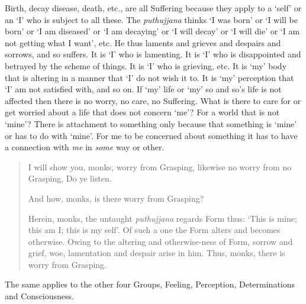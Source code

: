 Birth, decay disease, death, etc., are all Suffering because they apply to a `self' or an `I' who is subject to all these. The \textit{puthujjana} thinks `I was born' or `I will be born' or `I am diseased' or `I am decaying' or `I will decay' or `I will die' or `I am not getting what I want', etc. He thus laments and grieves and despairs and sorrows, and so suffers. It is `I' who is lamenting. It is `I' who is disappointed and betrayed by the scheme of things. It is `I' who is grieving, etc. It is `my' body that is altering in a manner that `I' do not wish it to. It is `my' perception that `I' am not satisfied with, and so on. If `my' life or `my' so and so's life is not affected then there is no worry, no care, no Suffering. What is there to care for or get worried about a life that does not concern `me'? For a world that is not `mine'? There is attachment to something only because that something is `mine' or has to do with `mine'. For me to be concerned about something it has to have a connection with \emph{me} in \emph{some} way or other.

\begin{quote}
I will show you, monks, worry from Grasping, likewise no worry from no Grasping, Do ye listen.

And how, monks, is there worry from Grasping?

Herein, monks, the untaught \textit{puthujjana} regards Form thus: `This is mine; this am I; this is my self'. Of such a one the Form alters and becomes otherwise. Owing to the altering and otherwise-ness of Form, sorrow and grief, woe, lamentation and despair arise in him. Thus, monks, there is worry from Grasping.
\end{quote}

The same applies to the other four Groups, Feeling, Perception, Determinations and Consciousness.

